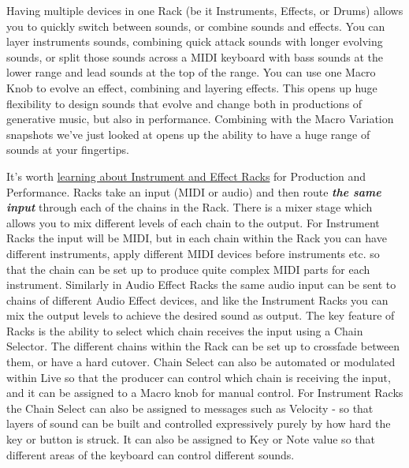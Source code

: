 \documentclass[
  12pt,
  letterpaper,
  oneside,
  open=any]{scrbook}
\begin{document}
\begin{tcolorbox}[enhanced jigsaw, titlerule=0mm, toprule=.15mm, bottomrule=.15mm, colframe=quarto-callout-tip-color-frame, bottomtitle=1mm, opacityback=0, breakable, leftrule=.75mm, coltitle=black, colback=white, rightrule=.15mm, arc=.35mm, toptitle=1mm, title=\textcolor{quarto-callout-tip-color}{\faLightbulb}\hspace{0.5em}{Key idea}, opacitybacktitle=0.6, left=2mm, colbacktitle=quarto-callout-tip-color!10!white]

Having multiple devices in one Rack (be it Instruments, Effects, or
Drums) allows you to quickly switch between sounds, or combine sounds
and effects. You can layer instruments sounds, combining quick attack
sounds with longer evolving sounds, or split those sounds across a MIDI
keyboard with bass sounds at the lower range and lead sounds at the top
of the range. You can use one Macro Knob to evolve an effect, combining
and layering effects. This opens up huge flexibility to design sounds
that evolve and change both in productions of generative music, but also
in performance. Combining with the Macro Variation snapshots we've just
looked at opens up the ability to have a huge range of sounds at your
fingertips.

\end{tcolorbox}

It's worth
\href{https://www.ableton.com/en/live-manual/12/instrument-drum-and-effect-racks/\#chain-list}{learning
about Instrument and Effect Racks} for Production and Performance. Racks
take an input (MIDI or audio) and then route \textbf{\emph{the same
input}} through each of the chains in the Rack. There is a mixer stage
which allows you to mix different levels of each chain to the output.
For Instrument Racks the input will be MIDI, but in each chain within
the Rack you can have different instruments, apply different MIDI
devices before instruments etc. so that the chain can be set up to
produce quite complex MIDI parts for each instrument. Similarly in Audio
Effect Racks the same audio input can be sent to chains of different
Audio Effect devices, and like the Instrument Racks you can mix the
output levels to achieve the desired sound as output. The key feature of
Racks is the ability to select which chain receives the input using a
Chain Selector. The different chains within the Rack can be set up to
crossfade between them, or have a hard cutover. Chain Select can also be
automated or modulated within Live so that the producer can control
which chain is receiving the input, and it can be assigned to a Macro
knob for manual control. For Instrument Racks the Chain Select can also
be assigned to messages such as Velocity - so that layers of sound can
be built and controlled expressively purely by how hard the key or
button is struck. It can also be assigned to Key or Note value so that
different areas of the keyboard can control different sounds.
\end{document}

